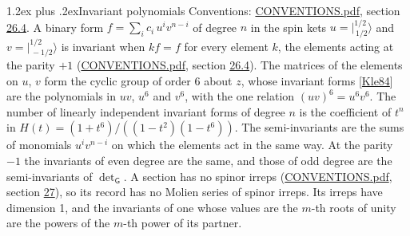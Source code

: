 \documentclass[10pt,a4paper]{article}
\makeatletter
\renewcommand\section{\@startsection{section}{1}{\z@}{-3ex plus -1ex minus -.2ex}%
  {1.2ex plus .2ex}{\normalfont\large\sffamily\bfseries\color{parttitle}}}
\numberwithin{equation}{section}
\newcommand{\grp}[1]{\mathsf{#1}}
\newcommand{\jm}[2]{\bigl\lvert{}^{#1}_{\,#2}\bigr\rangle}
\makeatother
\begin{document}
\section{Invariant polynomials}\label{s:invariants}
Conventions: \href{../../CONVENTIONS.pdf}{CONVENTIONS.pdf}, section \href{../../CONVENTIONS.pdf\#conv.26.4}{26.4}.
\leavevmode\label{n:local.spinor.uv}\label{n:local.binary.form}A binary form $f = \sum_i c_i\, u^i v^{n-i}$ of degree $n$ in the spin kets $u = \jm{1/2}{1/2}$ and $v = \jm{1/2}{-1/2}$ is invariant when $k f = f$ for every element $k$, the elements acting at the parity $+1$ (\href{../../CONVENTIONS.pdf}{CONVENTIONS.pdf}, section \href{../../CONVENTIONS.pdf\#conv.26.4}{26.4}).
The matrices of the elements on $u$, $v$ form the cyclic group of order 6 about $z$, whose invariant forms [\href{../../../REFERENCES.pdf\#ref.Kle84}{Kle84}] are the polynomials in $uv$, $u^{6}$ and $v^{6}$, with the one relation $(uv)^{6} = u^{6}v^{6}$. \label{n:function.hilbert}The number of linearly independent invariant forms of degree $n$ is the coefficient of $t^n$ in $H(t) = (1 + t^{6})/((1-t^{2})(1-t^{6}))$. The semi-invariants are the sums of monomials $u^i v^{n-i}$ on which the elements act in the same way. At the parity $-1$ the invariants of even degree are the same, and those of odd degree are the semi-invariants of $\det_{\grp{G}}$. A section has no spinor irreps (\href{../../CONVENTIONS.pdf}{CONVENTIONS.pdf}, section \href{../../CONVENTIONS.pdf\#conv.27}{27}), so its record has no Molien series of spinor irreps. Its irreps have dimension 1, and the invariants of one whose values are the $m$-th roots of unity are the powers of the $m$-th power of its partner.
\end{document}
